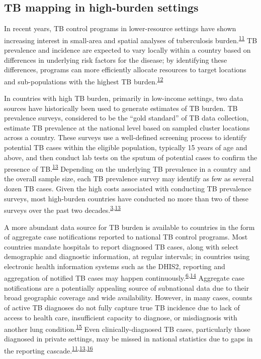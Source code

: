 \documentclass[
]{article}
\begin{document}
\hypertarget{tb-mapping-in-high-burden-settings}{%
\subsection{TB mapping in high-burden settings}\label{tb-mapping-in-high-burden-settings}}

In recent years, TB control programs in lower-resource settings have shown increasing interest in small-area and spatial analyses of tuberculosis burden.\textsuperscript{\protect\hyperlink{ref-Glaziou2018a}{11}} TB prevalence and incidence are expected to vary locally within a country based on differences in underlying risk factors for the disease; by identifying these differences, programs can more efficiently allocate resources to target locations and sub-populations with the highest TB burden.\textsuperscript{\protect\hyperlink{ref-Rood2019}{12}}

In countries with high TB burden, primarily in low-income settings, two data sources have historically been used to generate estimates of TB burden. TB prevalence surveys, considered to be the ``gold standard'' of TB data collection, estimate TB prevalence at the national level based on sampled cluster locations across a country. These surveys use a well-defined screening process to identify potential TB cases within the eligible population, typically 15 years of age and above, and then conduct lab tests on the sputum of potential cases to confirm the presence of TB.\textsuperscript{\protect\hyperlink{ref-Glaziou2008}{13}} Depending on the underlying TB prevalence in a country and the overall sample size, each TB prevalence survey may identify as few as several dozen TB cases. Given the high costs associated with conducting TB prevalence surveys, most high-burden countries have conducted no more than two of these surveys over the past two decades.\textsuperscript{\protect\hyperlink{ref-WorldHealthOrganization2019}{3},\protect\hyperlink{ref-Glaziou2008}{13}}

A more abundant data source for TB burden is available to countries in the form of aggregate case notifications reported to national TB control programs. Most countries mandate hospitals to report diagnosed TB cases, along with select demographic and diagnostic information, at regular intervals; in countries using electronic health information systems such as the DHIS2, reporting and aggregation of notified TB cases may happen continuously.\textsuperscript{\protect\hyperlink{ref-WorldHealthOrganization2020}{6},\protect\hyperlink{ref-Dehnavieh2019}{14}} Aggregate case notifications are a potentially appealing source of subnational data due to their broad geographic coverage and wide availability. However, in many cases, counts of active TB diagnoses do not fully capture true TB incidence due to lack of access to health care, insufficient capacity to diagnose, or misdiagnosis with another lung condition.\textsuperscript{\protect\hyperlink{ref-Karamagi2018}{15}} Even clinically-diagnosed TB cases, particularly those diagnosed in private settings, may be missed in national statistics due to gaps in the reporting cascade.\textsuperscript{\protect\hyperlink{ref-Glaziou2018a}{11},\protect\hyperlink{ref-Glaziou2008}{13},\protect\hyperlink{ref-Uplekar2016}{16}}
\end{document}
